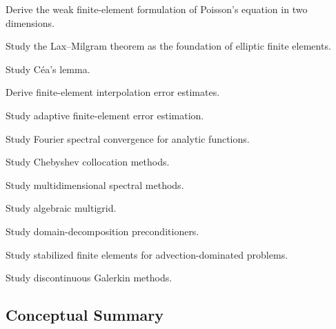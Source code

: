 \begin{exercise}[4]
Derive the weak finite-element formulation of Poisson's equation in two
dimensions.
\end{exercise}

\begin{exercise}[4]
Study the Lax--Milgram theorem as the foundation of elliptic finite
elements.
\end{exercise}

\begin{exercise}[4]
Study C\'ea's lemma.
\end{exercise}

\begin{exercise}[4]
Derive finite-element interpolation error estimates.
\end{exercise}

\begin{exercise}[4]
Study adaptive finite-element error estimation.
\end{exercise}

\begin{exercise}[4]
Study Fourier spectral convergence for analytic functions.
\end{exercise}

\begin{exercise}[4]
Study Chebyshev collocation methods.
\end{exercise}

\begin{exercise}[4]
Study multidimensional spectral methods.
\end{exercise}

\begin{exercise}[4]
Study algebraic multigrid.
\end{exercise}

\begin{exercise}[4]
Study domain-decomposition preconditioners.
\end{exercise}

\begin{exercise}[4]
Study stabilized finite elements for advection-dominated problems.
\end{exercise}

\begin{exercise}[4]
Study discontinuous Galerkin methods.
\end{exercise}

\subsection{Conceptual Summary}
\label{subsec:numerical-pde-summary}

